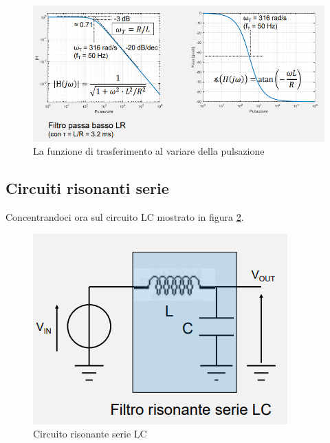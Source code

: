 \documentclass{article}
\begin{document}
\begin{figure}[h]
  \centering
  \includegraphics[scale=0.7]{IM_circuito_LR_passivo_grafici}
  \caption{La funzione di trasferimento al variare della pulsazione}
  \label{Schema_circuito_LR_passivo_grafici}
\end{figure}

\clearpage










\subsection{Circuiti risonanti serie}

Concentrandoci ora sul circuito LC mostrato in figura \ref{Schema_circuito_risonante_serie_LC}.

\begin{figure}[h]
  \centering
  \includegraphics[scale=0.5]{IM_circuito_risonante_serie_LC}
  \caption{Circuito risonante serie LC}
  \label{Schema_circuito_risonante_serie_LC}
\end{figure}
\end{document}
